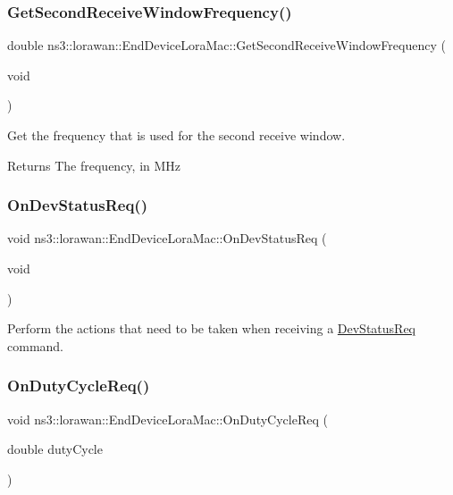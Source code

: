 \subsubsection{\texorpdfstring{Get\+Second\+Receive\+Window\+Frequency()}{GetSecondReceiveWindowFrequency()}}
{\footnotesize\ttfamily double ns3\+::lorawan\+::\+End\+Device\+Lora\+Mac\+::\+Get\+Second\+Receive\+Window\+Frequency (\begin{DoxyParamCaption}\item[{void}]{ }\end{DoxyParamCaption})}

Get the frequency that is used for the second receive window.

\begin{DoxyReturn}{Returns}
The frequency, in M\+Hz 
\end{DoxyReturn}
\mbox{\label{classns3_1_1lorawan_1_1EndDeviceLoraMac_a46ee940bbd3311012614b352761158df}} 
\subsubsection{\texorpdfstring{On\+Dev\+Status\+Req()}{OnDevStatusReq()}}
{\footnotesize\ttfamily void ns3\+::lorawan\+::\+End\+Device\+Lora\+Mac\+::\+On\+Dev\+Status\+Req (\begin{DoxyParamCaption}\item[{void}]{ }\end{DoxyParamCaption})}

Perform the actions that need to be taken when receiving a \hyperlink{classns3_1_1lorawan_1_1DevStatusReq}{Dev\+Status\+Req} command. \mbox{\label{classns3_1_1lorawan_1_1EndDeviceLoraMac_ab00b3b62618312878a3e231d08e011d9}} 
\subsubsection{\texorpdfstring{On\+Duty\+Cycle\+Req()}{OnDutyCycleReq()}}
{\footnotesize\ttfamily void ns3\+::lorawan\+::\+End\+Device\+Lora\+Mac\+::\+On\+Duty\+Cycle\+Req (\begin{DoxyParamCaption}\item[{double}]{duty\+Cycle }\end{DoxyParamCaption})}

